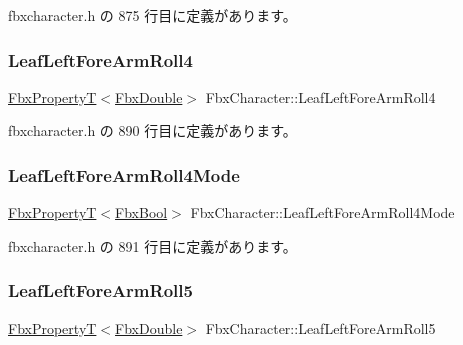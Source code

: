 fbxcharacter.\+h の 875 行目に定義があります。

\mbox{\label{class_fbx_character_a02279dced3b6a214c2d84bc5be923035}} 
\subsubsection{\texorpdfstring{Leaf\+Left\+Fore\+Arm\+Roll4}{LeafLeftForeArmRoll4}}
{\footnotesize\ttfamily \hyperlink{class_fbx_property_t}{Fbx\+PropertyT}$<$\hyperlink{fbxtypes_8h_a171e72a1c46fc15c1a6c9c31948c1c5b}{Fbx\+Double}$>$ Fbx\+Character\+::\+Leaf\+Left\+Fore\+Arm\+Roll4}



 fbxcharacter.\+h の 890 行目に定義があります。

\mbox{\label{class_fbx_character_a4bb0d0c05ec6d9ee54386042adb9bbc2}} 
\subsubsection{\texorpdfstring{Leaf\+Left\+Fore\+Arm\+Roll4\+Mode}{LeafLeftForeArmRoll4Mode}}
{\footnotesize\ttfamily \hyperlink{class_fbx_property_t}{Fbx\+PropertyT}$<$\hyperlink{fbxtypes_8h_a92e0562b2fe33e76a242f498b362262e}{Fbx\+Bool}$>$ Fbx\+Character\+::\+Leaf\+Left\+Fore\+Arm\+Roll4\+Mode}



 fbxcharacter.\+h の 891 行目に定義があります。

\mbox{\label{class_fbx_character_aeff67c8d51b8ae048237639dda9bbba1}} 
\subsubsection{\texorpdfstring{Leaf\+Left\+Fore\+Arm\+Roll5}{LeafLeftForeArmRoll5}}
{\footnotesize\ttfamily \hyperlink{class_fbx_property_t}{Fbx\+PropertyT}$<$\hyperlink{fbxtypes_8h_a171e72a1c46fc15c1a6c9c31948c1c5b}{Fbx\+Double}$>$ Fbx\+Character\+::\+Leaf\+Left\+Fore\+Arm\+Roll5}



